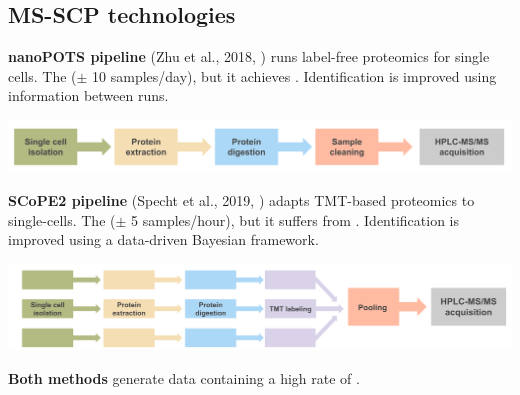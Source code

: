 \documentclass{article}
\begin{document}
\setlength{\columnsep}{0.5cm}
\begin{multicols}{2}

\noindent
\begin{minipage}[t]{\linewidth}
  \vspace{0.5cm}
  \section*{\huge MS-SCP technologies}
  \large
  \textbf{\large nanoPOTS pipeline} (Zhu et al., 2018, \cite{Zhu2018-bf}) runs label-free proteomics for single cells. The \textbf{\color{BrickRed}{throughput is low}} ($\pm$ 10 samples/day), but it achieves \textbf{\color{OliveGreen}{accurate peptide quantification}}. Identification is improved using information between runs. 
  \vspace{-0.3cm}
  \begin{center}
    \includegraphics[width=0.87\linewidth]{figs/nanopots.png} \\
  \end{center}
  
  \textbf{\large SCoPE2 pipeline} (Specht et al., 2019, \cite{Specht2019-jm}) adapts TMT-based proteomics to single-cells. The \textbf{\color{OliveGreen}{throughput is higher}} ($\pm$ 5 samples/hour), but it suffers from \textbf{\color{BrickRed}{batch effects}}. Identification is improved using a data-driven Bayesian framework.
  \vspace{-0.3cm}
  \begin{center}
    \includegraphics[width=0.9\linewidth]{figs/scopems.png} \\
  \end{center}
  
  \textbf{\large Both methods} generate data containing a high rate of \textbf{\color{BrickRed}{missing values}}.
    
\end{minipage}


\end{multicols}
\end{document}
